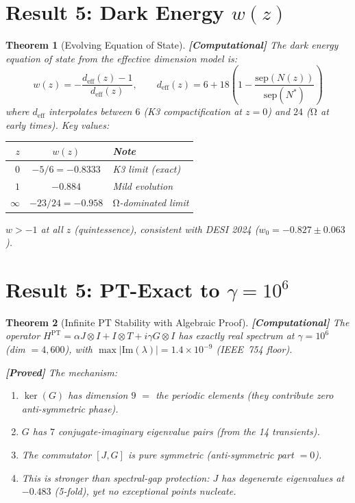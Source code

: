 \documentclass[12pt,a4paper]{article}
\newcommand{\proved}[1]{\textcolor{proved}{\textbf{[Proved]}} #1}
\newcommand{\computational}[1]{\textcolor{computational}{\textbf{[Computational]}} #1}
\newtheorem{theorem}{Theorem}[section]
\theoremstyle{definition}\newtheorem{definition}[theorem]{Definition}
\theoremstyle{remark}\newtheorem{remark}[theorem]{Remark}
\renewcommand{\O}{\mathrm{\Omega}}
\begin{document}
\section{Result 5: Dark Energy $w(z)$}
\label{sec:dark_energy}

\begin{theorem}[Evolving Equation of State]
\label{thm:wz}
\computational{The dark energy equation of state from the effective dimension
model is:}
\begin{equation}
  w(z) = -\frac{d_{\mathrm{eff}}(z) - 1}{d_{\mathrm{eff}}(z)}, \qquad
  d_{\mathrm{eff}}(z) = 6 + 18\left(1 - \frac{\mathrm{sep}(N(z))}{\mathrm{sep}(N^*)}\right)
\end{equation}
where $d_{\mathrm{eff}}$ interpolates between $6$ (K3 compactification at $z = 0$)
and $24$ ($\O$ at early times). Key values:
\begin{center}
\begin{tabular}{rcl}
\toprule
$z$ & $w(z)$ & Note \\
\midrule
$0$ & $-5/6 = -0.8333$ & K3 limit (exact) \\
$1$ & $-0.884$ & Mild evolution \\
$\infty$ & $-23/24 = -0.958$ & $\O$-dominated limit \\
\bottomrule
\end{tabular}
\end{center}
$w > -1$ at all $z$ (quintessence), consistent with DESI 2024
($w_0 = -0.827 \pm 0.063$).
\end{theorem}

\section{Result 5: PT-Exact to $\gamma = 10^6$}
\label{sec:pt}

\begin{theorem}[Infinite PT Stability with Algebraic Proof]
\label{thm:pt}
\computational{The operator $H^{\mathrm{PT}} = \alpha J \otimes I + I \otimes T
+ i\gamma G \otimes I$ has exactly real spectrum at $\gamma = 10^6$
(dim $= 4{,}600$), with $\max|\mathrm{Im}(\lambda)| = 1.4 \times 10^{-9}$
(IEEE~754 floor).}

\proved{The mechanism:}
\begin{enumerate}
  \item $\ker(G)$ has dimension $9$ $=$ the periodic elements (they contribute
  zero anti-symmetric phase).
  \item $G$ has $7$ conjugate-imaginary eigenvalue pairs (from the 14 transients).
  \item The commutator $[J, G]$ is \emph{pure symmetric} (anti-symmetric part
  $= 0$).
  \item This is stronger than spectral-gap protection: $J$ has degenerate
  eigenvalues at $-0.483$ (5-fold), yet no exceptional points nucleate.
\end{enumerate}
\end{theorem}
\end{document}

